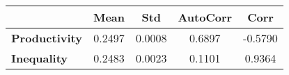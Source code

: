 \begin{tiny}\begin{tabular}{|l|c|c|c|c|}
\hline
&\textbf{Mean}&\textbf{Std}&\textbf{AutoCorr}&\textbf{Corr}\\\hline
\textbf{Productivity}&0.2497&0.0008&0.6897&-0.5790\\\hline
\textbf{Inequality}&0.2483&0.0023&0.1101&0.9364\\\hline
\end{tabular}
\end{tiny}